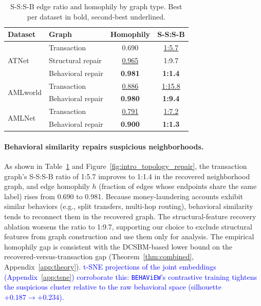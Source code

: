 \documentclass[sigconf,natbib=true,anonymous=true]{acmart}
\theoremstyle{definition}
\newcommand{\method}{\texttt{BEHAViEW}\xspace}
\newcommand{\hofinet}{ATNet\xspace} %
\newcommand{\BLUE}[1]{\textcolor{blue}{#1}}
\begin{document}
\begin{table}[t]
\centering
\caption{S-S:S-B edge ratio and homophily by graph type. Best per dataset in bold, second-best underlined.}
\label{tab:ss_sb}
\small
\setlength{\tabcolsep}{5pt}
\begin{tabular}{llcc}
\toprule
\textbf{Dataset} & \textbf{Graph} & \textbf{Homophily} & \textbf{S-S:S-B} \\
\midrule
\multirow{3}{*}{\hofinet}
  & Transaction      & 0.690 & \underline{1:5.7} \\
  & Structural repair & \underline{0.965} & 1:9.7 \\
  & Behavioral repair & \textbf{0.981} & \textbf{1:1.4} \\
\midrule
\multirow{2}{*}{AMLworld}
  & Transaction      & \underline{0.886} & \underline{1:15.8} \\
  & Behavioral repair & \textbf{0.980} & \textbf{1:9.4} \\
\midrule
\multirow{2}{*}{AMLNet}
  & Transaction      & \underline{0.791} & \underline{1:7.2} \\
  & Behavioral repair & \textbf{0.900} & \textbf{1:1.3} \\
\bottomrule
\end{tabular}
\end{table}

\paragraph{\textbf{Behavioral similarity repairs suspicious neighborhoods.}} As shown in Table~\ref{tab:ss_sb} and Figure~\ref{fig:intro_topology_repair}, the transaction graph's S-S:S-B ratio of 1:5.7 improves to 1:1.4 in the recovered neighborhood graph, and edge homophily $h$ (fraction of edges whose endpoints share the same label) rises from 0.690 to 0.981. Because money-laundering accounts exhibit similar behaviors (e.g., split transfers, multi-hop routing), behavioral similarity tends to reconnect them in the recovered graph. The structural-feature recovery ablation worsens the ratio to 1:9.7, supporting our choice to exclude structural features from graph construction and use them only for analysis. The empirical homophily gap is consistent with the DCSBM-based lower bound on the recovered-versus-transaction gap (Theorem~\ref{thm:combined}, Appendix~\ref{app:theory}).
\BLUE{t-SNE projections of the joint embeddings (Appendix~\ref{app:tsne}) corroborate this: \method's contrastive training tightens the suspicious cluster relative to the raw behavioral space (silhouette $+0.187 \to +0.234$).}
\end{document}
